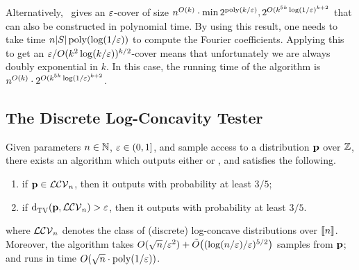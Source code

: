  Alternatively,~\cite{DDKT:16} gives an $\eps$-cover of size $n^{O(k)} \cdot \min{2^{\poly(k/\eps)}, 2^{O(k^{5k} \log(1/\eps)^{k+2}}}$ that can also be constructed in polynomial time. By using this result, one needs to take time $n|S|\poly(\log(1/\eps))$ to compute the Fourier coefficients. Applying this to get an $\eps/O(k^2\log(k/\eps))^{k/2}$-cover means that unfortunately we are always doubly exponential in $k$. In this case, the running time of the algorithm is $n^{O(k)} \cdot  2^{O(k^{5k} \log(1/\eps)^{k+2}}$.
 
 

 
\subsection{The Discrete Log-Concavity Tester}\label{sec:log:concaves}
\begin{theorem}
Given parameters $n\in\N$, $\eps\in(0,1]$, and sample access to a distribution $\p$ over $\Z$, there exists an algorithm which outputs either \accept or \reject, and satisfies the following.
    \begin{enumerate}
        \item if $\p \in \classlogconcave[n]$, then it outputs \accept with probability at least $3/5$;
        \item if $\totalvardist{\p}{\classlogconcave[n]} > \eps$, then it outputs \reject with probability at least $3/5$.
    \end{enumerate}
where $\classlogconcave[n]$ denotes the class of (discrete) log-concave distributions over $\modulo{n}$. Moreover, the algorithm takes $O(\sqrt{n}/\eps^2) + \tildeO{(\log(n/\eps)/\eps)^{5/2}}$ samples from $\p$; and runs in time $O(\sqrt{n} \cdot \poly(1/\eps))$.
\end{theorem}

